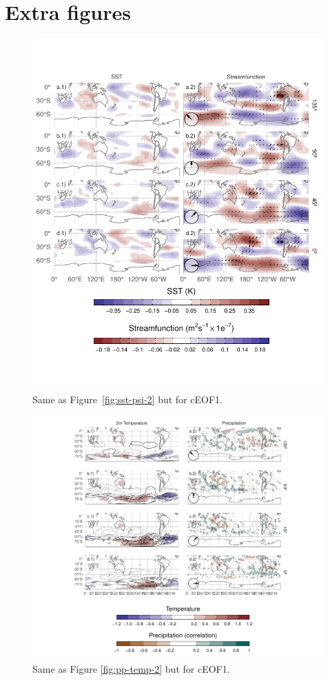 \documentclass[pdflatex,sn-basic]{sn-jnl}
\theoremstyle{thmstyleone}%
\theoremstyle{thmstyletwo}%
\theoremstyle{thmstylethree}%
\begin{document}
\appendix


\hypertarget{extra-figures}{%
\section{Extra figures}\label{extra-figures}}

\newpage



\begin{figure}
\includegraphics{../figures/sst-psi-1-1} \caption{Same as Figure~\ref{fig:sst-psi-2} but for cEOF1.}\label{fig:sst-psi-1}
\end{figure}



\begin{figure}
\centering
\includegraphics{../figures/pp-temp-1-1.pdf}
\caption{\label{fig:pp-temp-1}Same as Figure \ref{fig:pp-temp-2} but for cEOF1.}
\end{figure}



\end{document}
